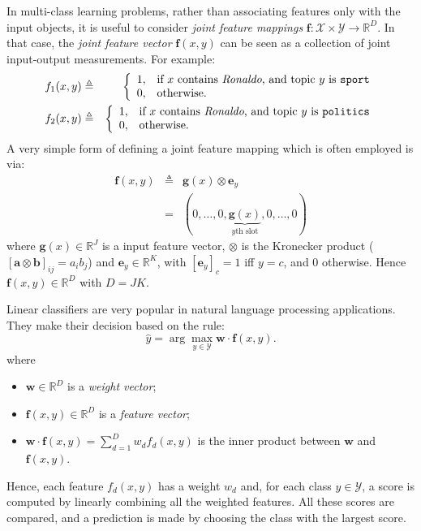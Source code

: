 In multi-class learning problems, rather than associating features only with the input objects, 
it is useful to consider \emph{joint feature mappings} $\boldsymbol{f}:\mathcal{X}\times \mathcal{Y}\rightarrow \mathbb{R}^D$. 
In that case, the \emph{joint feature vector}  $\boldsymbol{f}(x,y)$ can be seen as a collection of joint input-output measurements. 
For example: 
\begin{eqnarray}
f_1(x,y) &\triangleq& 
\left\{
\begin{array}{ll}
1, & \text{if $x$ contains \emph{Ronaldo}, and topic $y$ is {\tt sport}}\\
0, & \text{otherwise.}
\end{array}
\right.\\
f_2(x,y) &\triangleq& 
\left\{
\begin{array}{ll}
1, & \text{if $x$ contains \emph{Ronaldo}, and topic $y$ is {\tt politics}}\\
0, & \text{otherwise.}
\end{array}
\right.
\end{eqnarray}  
A very simple form of defining a joint feature mapping which is often employed is via: 
\begin{eqnarray}\label{eq:jointfeatsimple}
\boldsymbol{f}(x,y) &\triangleq& \boldsymbol{g}(x) \otimes \boldsymbol{e}_y\nonumber\\
&=& (0,\ldots,0,\underbrace{\boldsymbol{g}(x)}_{\text{$y$th slot}},0,\ldots,0)
\end{eqnarray}
where $\boldsymbol{g}(x) \in \mathbb{R}^J$ is a input feature vector, $\otimes$ is the Kronecker product 
($[\boldsymbol{a} \otimes \boldsymbol{b}]_{ij} = a_i b_j$) and 
$\boldsymbol{e}_y \in \mathbb{R}^{K}$, with $[\boldsymbol{e}_y]_c = 1$ iff $y=c$, and 
$0$ otherwise. Hence $\boldsymbol{f}(x,y) \in \mathbb{R}^D$ with $D = JK$.





Linear classifiers are very popular in natural language processing applications. 
They make their decision based on the rule:
\begin{equation}
{\hat y} = \arg\max_{y \in \mathcal{Y}} \boldsymbol{w} \cdot \boldsymbol{f}(x,y).
\end{equation}
where
\begin{itemize}
\item $\boldsymbol{w} \in \mathbb{R}^D$ is a \emph{weight vector};
\item $\boldsymbol{f}(x,y) \in \mathbb{R}^D$ is a \emph{feature vector};
\item $\boldsymbol{w} \cdot \boldsymbol{f}(x,y) = \sum_{d=1}^D w_d f_d(x,y)$ is the inner product between $\boldsymbol{w}$ and $\boldsymbol{f}(x,y)$. 
\end{itemize}
Hence, each feature $f_d(x,y)$ has a weight $w_d$ and, for each class $y \in \mathcal{Y}$, 
a score is computed by linearly combining all the weighted features. All these scores are compared, 
and a prediction is made 
by choosing the class with the largest score. 

